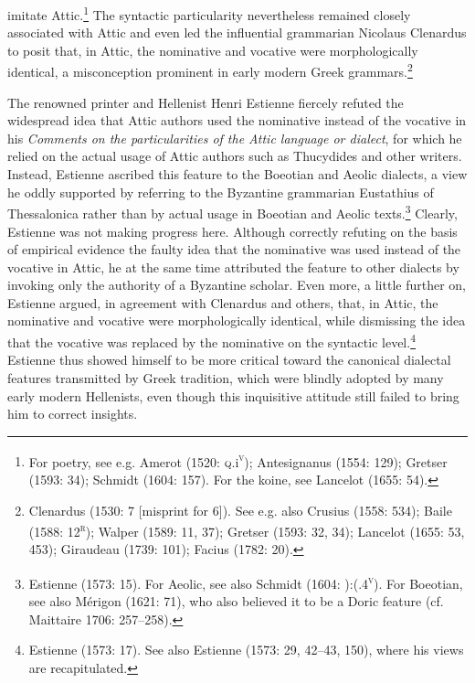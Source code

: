 \begin{styleStandard}
imitate Attic.\footnote{ For poetry, see e.g. Amerot (1520: \textsc{q.}i\textsc{\textsuperscript{v}}); Antesignanus (1554: 129); Gretser (1593: 34); Schmidt (1604: 157). For the koine, see Lancelot (1655: 54).} The syntactic particularity nevertheless remained closely associated with Attic and even led the influential grammarian Nicolaus Clenardus to posit that, in Attic, the nominative and vocative were morphologically identical, a misconception prominent in early modern Greek grammars.\footnote{ Clenardus (1530: 7 [misprint for 6]). See e.g. also Crusius (1558: 534); Baile (1588: 12\textsc{\textsuperscript{r}}); Walper (1589: 11, 37); Gretser (1593: 32, 34); Lancelot (1655: 53, 453); Giraudeau (1739: 101); Facius (1782: 20).}
\end{styleStandard}

\begin{styleStandard}
The renowned printer and Hellenist Henri Estienne fiercely refuted the widespread idea that Attic authors used the nominative instead of the vocative in his \textit{Comments on the particularities of the Attic language or dialect}, for which he relied on the actual usage of Attic authors such as Thucydides and other writers. Instead, Estienne ascribed this feature to the Boeotian and Aeolic dialects, a view he oddly supported by referring to the Byzantine grammarian Eustathius of Thessalonica rather than by actual usage in Boeotian and Aeolic texts.\footnote{ Estienne (1573: 15). For Aeolic, see also Schmidt (1604: ):(.4\textsc{\textsuperscript{v}}). For Boeotian, see also Mérigon (1621: 71), who also believed it to be a Doric feature (cf. Maittaire 1706: 257–258).} Clearly, Estienne was not making progress here. Although correctly refuting on the basis of empirical evidence the faulty idea that the nominative was used instead of the vocative in Attic, he at the same time attributed the feature to other dialects by invoking only the authority of a Byzantine scholar. Even more, a little further on, Estienne argued, in agreement with Clenardus and others, that, in Attic, the nominative and vocative were morphologically identical, while dismissing the idea that the vocative was replaced by the nominative on the syntactic level.\footnote{ Estienne (1573: 17). See also Estienne (1573: 29, 42–43, 150), where his views are recapitulated.} Estienne thus showed himself to be more critical toward the canonical dialectal features transmitted by Greek tradition, which were blindly adopted by many early modern Hellenists, even though this inquisitive attitude still failed to bring him to correct insights.
\end{styleStandard}

